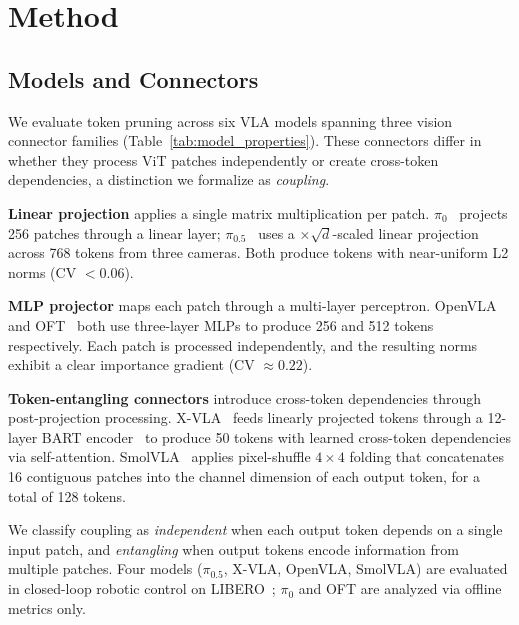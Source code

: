 \section{Method}
\label{sec:method}

\subsection{Models and Connectors}
\label{sec:models}

We evaluate token pruning across six VLA models spanning three vision connector families (Table~\ref{tab:model_properties}). These connectors differ in whether they process ViT patches independently or create cross-token dependencies, a distinction we formalize as \emph{coupling}.

\textbf{Linear projection} applies a single matrix multiplication per patch. $\pi_0$~\cite{black2024pi0} projects 256 patches through a linear layer; $\pi_0.5$~\cite{black2025pi05} uses a $\times\!\sqrt{d}$-scaled linear projection across 768 tokens from three cameras. Both produce tokens with near-uniform L2 norms (CV $< 0.06$).

\textbf{MLP projector} maps each patch through a multi-layer perceptron. OpenVLA~\cite{kim2024openvla} and OFT~\cite{kim2025openoft} both use three-layer MLPs to produce 256 and 512 tokens respectively. Each patch is processed independently, and the resulting norms exhibit a clear importance gradient (CV $\approx 0.22$).

\textbf{Token-entangling connectors} introduce cross-token dependencies through post-projection processing. X-VLA~\cite{zheng2025xvla} feeds linearly projected tokens through a 12-layer BART encoder~\cite{lewis2020bart} to produce 50 tokens with learned cross-token dependencies via self-attention. SmolVLA~\cite{shukor2025smolvla} applies pixel-shuffle $4{\times}4$ folding that concatenates 16 contiguous patches into the channel dimension of each output token, for a total of 128 tokens.

We classify coupling as \emph{independent} when each output token depends on a single input patch, and \emph{entangling} when output tokens encode information from multiple patches. Four models ($\pi_0.5$, X-VLA, OpenVLA, SmolVLA) are evaluated in closed-loop robotic control on LIBERO~\cite{liu2023libero}; $\pi_0$ and OFT are analyzed via offline metrics only.

